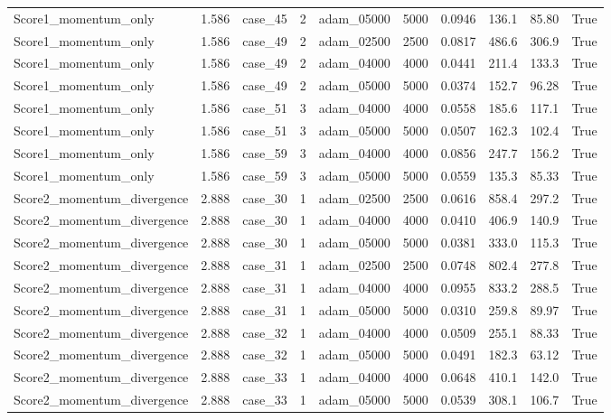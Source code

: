 \begin{longtable}{llllllllll}
Score1\_momentum\_only & 1.586 & case\_45 & 2 & adam\_05000 & 5000 & 0.0946 & 136.1 & 85.80 & True \\
Score1\_momentum\_only & 1.586 & case\_49 & 2 & adam\_02500 & 2500 & 0.0817 & 486.6 & 306.9 & True \\
Score1\_momentum\_only & 1.586 & case\_49 & 2 & adam\_04000 & 4000 & 0.0441 & 211.4 & 133.3 & True \\
Score1\_momentum\_only & 1.586 & case\_49 & 2 & adam\_05000 & 5000 & 0.0374 & 152.7 & 96.28 & True \\
Score1\_momentum\_only & 1.586 & case\_51 & 3 & adam\_04000 & 4000 & 0.0558 & 185.6 & 117.1 & True \\
Score1\_momentum\_only & 1.586 & case\_51 & 3 & adam\_05000 & 5000 & 0.0507 & 162.3 & 102.4 & True \\
Score1\_momentum\_only & 1.586 & case\_59 & 3 & adam\_04000 & 4000 & 0.0856 & 247.7 & 156.2 & True \\
Score1\_momentum\_only & 1.586 & case\_59 & 3 & adam\_05000 & 5000 & 0.0559 & 135.3 & 85.33 & True \\
Score2\_momentum\_divergence & 2.888 & case\_30 & 1 & adam\_02500 & 2500 & 0.0616 & 858.4 & 297.2 & True \\
Score2\_momentum\_divergence & 2.888 & case\_30 & 1 & adam\_04000 & 4000 & 0.0410 & 406.9 & 140.9 & True \\
Score2\_momentum\_divergence & 2.888 & case\_30 & 1 & adam\_05000 & 5000 & 0.0381 & 333.0 & 115.3 & True \\
Score2\_momentum\_divergence & 2.888 & case\_31 & 1 & adam\_02500 & 2500 & 0.0748 & 802.4 & 277.8 & True \\
Score2\_momentum\_divergence & 2.888 & case\_31 & 1 & adam\_04000 & 4000 & 0.0955 & 833.2 & 288.5 & True \\
Score2\_momentum\_divergence & 2.888 & case\_31 & 1 & adam\_05000 & 5000 & 0.0310 & 259.8 & 89.97 & True \\
Score2\_momentum\_divergence & 2.888 & case\_32 & 1 & adam\_04000 & 4000 & 0.0509 & 255.1 & 88.33 & True \\
Score2\_momentum\_divergence & 2.888 & case\_32 & 1 & adam\_05000 & 5000 & 0.0491 & 182.3 & 63.12 & True \\
Score2\_momentum\_divergence & 2.888 & case\_33 & 1 & adam\_04000 & 4000 & 0.0648 & 410.1 & 142.0 & True \\
Score2\_momentum\_divergence & 2.888 & case\_33 & 1 & adam\_05000 & 5000 & 0.0539 & 308.1 & 106.7 & True \\

\end{longtable}
